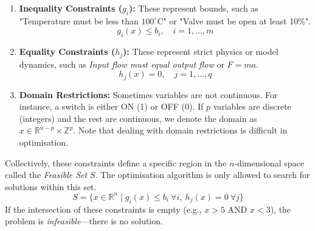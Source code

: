 \begin{enumerate}
	\item \textbf{Inequality Constraints ($g_i$):} These represent bounds, such as "Temperature must be less than $100^{\circ}\mathrm{C}$" or "Valve must be open at least 10\%".
	\[ g_i(x) \leq b_i, \quad i = 1, \dots, m \]
	
	\item \textbf{Equality Constraints ($h_j$):} These represent strict physics or model dynamics, such as \emph{Input flow must equal output flow} or $F = ma$.
	\[ h_j(x) = 0, \quad j = 1, \dots, q \]
	
	\item \textbf{Domain Restrictions:} Sometimes variables are not continuous. For instance, a switch is either ON (1) or OFF (0). If $p$ variables are discrete (integers) and the rest are continuous, we denote the domain as $x \in \mathbb{R}^{n-p} \times \mathbb{Z}^p$. Note that dealing with domain restrictions is difficult in optimisation. 
\end{enumerate}


Collectively, these constraints define a specific region in the $n$-dimensional space called the \emph{Feasible Set} $S$. The optimisation algorithm is only allowed to search for solutions within this set.
\begin{equation}
	S = \{ x \in \mathbb{R}^n \mid g_i(x) \leq b_i \ \forall i, \ h_j(x) = 0 \ \forall j \}
\end{equation}
If the intersection of these constraints is empty (e.g., $x > 5$ AND $x < 3$), the problem is \textit{infeasible}—there is no solution.

